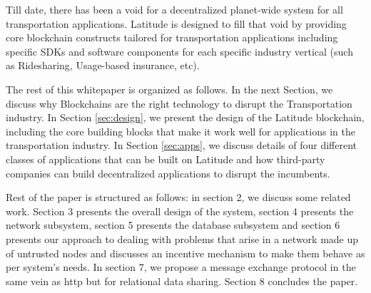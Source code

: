 Till date, there has been a void for a decentralized planet-wide system for all transportation applications. Latitude is
designed to fill that void by providing core blockchain constructs tailored for transportation applications including
specific SDKs and software components for each specific industry vertical (such as Ridesharing, Usage-based insurance,
etc).

The rest of this whitepaper is organized as follows. In the next Section, we discuss why Blockchains are the right 
technology to disrupt the Transportation industry. In Section \ref{sec:design}, we present the design of the Latitude
blockchain, including the core building blocks that make it work well for applications in the transportation industry.
In Section \ref{sec:apps}, we discuss details of four different classes of applications that can be built on Latitude
and how third-party companies can build decentralized applications to disrupt the incumbents.


%

Rest of the paper is structured as follows: in section 2, we discuss some related work. Section 3 presents the overall
design of the system, section 4 presents the network subsystem, section 5 presents the database subsystem and section 6
presents our approach to dealing with problems that arise in a network made up of untrusted nodes and discusses an
incentive mechanism to make them behave as per system's needs. In section 7, we propose a message exchange protocol in
the same vein as http but for relational data sharing. Section 8 concludes the paper.
